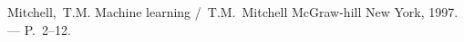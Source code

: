 Mitchell,~T.M. Machine learning /~T.M.~Mitchell
\newblock McGraw-hill New York, 1997. ---
\newblock P.~2--12.
